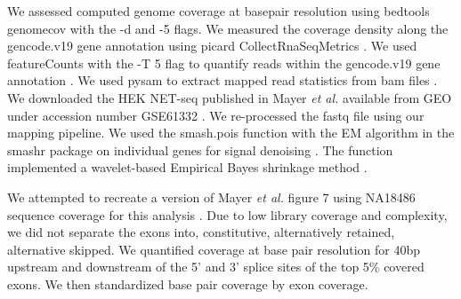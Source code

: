  We assessed computed genome coverage at basepair resolution using bedtools genomecov with the -d and -5 flags. We measured the coverage density along the gencode.v19 gene annotation using picard CollectRnaSeqMetrics \citep{frankish_gencode_2019,quinlan_bedtools_2010}. We used featureCounts with the -T 5 flag to quantify reads within the gencode.v19 gene annotation \citep{frankish_gencode_2019, Liao2014}. We used pysam to extract mapped read statistics from bam files \citep{Li2009}. We downloaded the HEK NET-seq published in Mayer \emph{et al.} available from GEO under accession number GSE61332 \cite{mayer_genome-wide_2016}.  We re-processed the fastq file using our mapping pipeline. We used the smash.pois function with the EM algorithm in the smashr package on individual genes for signal denoising \citep{xing_flexible_2016}. The function implemented a wavelet-based Empirical Bayes shrinkage method \citep{xing_flexible_2016}. 

We attempted to recreate a version of Mayer \emph{et al.} figure 7 using NA18486 sequence coverage for this analysis \cite{mayer_genome-wide_2016}. Due to low library coverage and complexity, we did not separate the exons into, constitutive, alternatively retained, alternative skipped. We quantified coverage at base pair resolution for 40bp upstream and downstream of the 5' and 3' splice sites of the top 5\% covered exons. We then standardized base pair coverage by exon coverage.   
